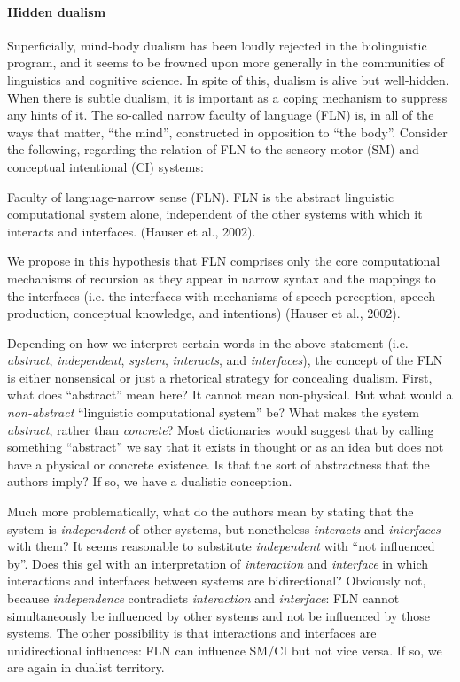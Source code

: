 \paragraph{Hidden dualism}

Superficially, mind-body dualism has been loudly rejected in the biolinguistic program, and it seems to be frowned upon more generally in the communities of linguistics and cognitive science. In spite of this, dualism is alive but well-hidden. When there is subtle dualism, it is important as a coping mechanism to suppress any hints of it. The so-called narrow faculty of language (FLN) is, in all of the ways that matter, “the mind”, constructed in opposition to “the body”. Consider the following, regarding the relation of FLN to the sensory motor (SM) and conceptual intentional (CI) systems:

Faculty of language-narrow sense (FLN). FLN is the abstract linguistic computational system alone, independent of the other systems with which it interacts and interfaces. (Hauser et al., 2002).

We   propose   in   this   hypothesis   that   FLN   comprises   only   the   core computational  mechanisms  of  recursion  as  they  appear  in  narrow  syntax  and  the mappings  to  the  interfaces (i.e.  the  interfaces  with  mechanisms  of  speech  perception, speech  production,  conceptual  knowledge,  and  intentions) (Hauser et al., 2002).

  Depending on how we interpret certain words in the above statement (i.e. \textit{abstract}, \textit{independent}, \textit{system}, \textit{interacts}, and \textit{interfaces}), the concept of the FLN is either nonsensical or just a rhetorical strategy for concealing dualism. First, what does “abstract” mean here? It cannot mean non-physical. But what would a \textit{non-abstract} “linguistic computational system” be? What makes the system \textit{abstract}, rather than \textit{concrete}? Most dictionaries would suggest that by calling something “abstract” we say that it exists in thought or as an idea but does not have a physical or concrete existence. Is that the sort of abstractness that the authors imply? If so, we have a dualistic conception. 

  Much more problematically, what do the authors mean by stating that the system is \textit{independent} of other systems, but nonetheless \textit{interacts} and \textit{interfaces} with them? It seems reasonable to substitute \textit{independent} with “not influenced by”. Does this gel with an interpretation of \textit{interaction} and \textit{interface} in which interactions and interfaces between systems are bidirectional? Obviously not, because \textit{independence} contradicts \textit{interaction} and \textit{interface}: FLN cannot simultaneously be influenced by other systems and not be influenced by those systems. The other possibility is that interactions and interfaces are unidirectional influences: FLN can influence SM/CI but not vice versa. If so, we are again in dualist territory. 

